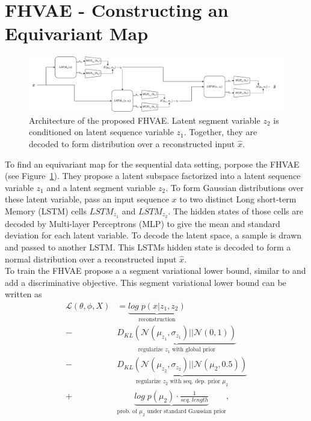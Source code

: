 \documentclass{article} %
\begin{document}
\section*{FHVAE - Constructing an Equivariant Map}
\begin{figure}
	\label{fig:fhave}
	\centering
	\includegraphics[width=1\linewidth]{../figures/fhvae_complete.pdf}
	\caption{Architecture of the proposed FHVAE. Latent segment variable $z_2$ is conditioned on latent sequence variable $z_1$. Together, they are decoded to form distribution over a reconstructed input $\hat{x}$.}
\end{figure} 
To find an equivariant map for the sequential data setting, \citet{hsu2017unsupervised} porpose the FHVAE (see Figure~\ref{fig:fhave}). They propose a latent subspace factorized into a latent sequence variable $z_1$ and a latent segment variable $z_2$. To form Gaussian distributions over these latent variable, \citet{hsu2017unsupervised} pass an input sequence $x$ to two distinct Long short-term Memory (LSTM) \cite{hochreiter1997long} cells $LSTM_{z_1}$ and $LSTM_{z_2}$. The hidden states of those cells are decoded by Multi-layer Perceptrons (MLP) to give the mean and standard deviation for each latent variable. To decode the latent space, a sample is drawn and passed to another LSTM. This LSTMs hidden state is decoded to form a normal distribution over a reconstructed input $\hat{x}$.\\
To train the FHVAE \citet{hsu2017unsupervised} propose a a segment variational lower bound, similar to \citet{kingma2013auto} and add a discriminative objective.
This segment variational lower bound can be written as
\begin{align*}
\mathcal{L}(\theta, \phi, X)& = %
\underbrace{log\;p(x|z_1, z_2)}_{\text{reconstruction}}\\%
-&\underbrace{D_{KL}(\mathcal{N}(\mu_{z_1}, \sigma_{z_1})||\mathcal{N}(0,1))}_{\text{regularize $z_1$ with global prior}}\\
-&\underbrace{D_{KL}(\mathcal{N}(\mu_{z_2}, \sigma_{z_2})||\mathcal{N}(\mu_2,0.5))}_{\text{regularize $z_2$ with seq. dep. prior $\mu_2$}}\\
+&\underbrace{log\;p(\mu_2) \cdot \frac{1}{seq.\;length}}_{\text{prob. of $\mu_2$ under standard Gaussian prior}}, 
\end{align*}
\end{document}
